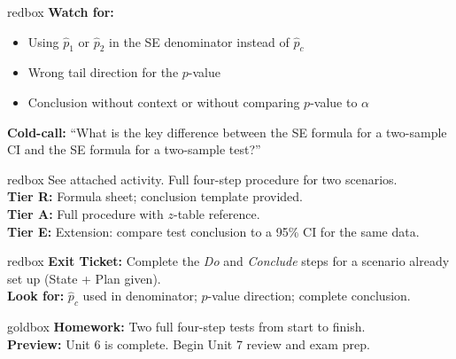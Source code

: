 \documentclass[10pt]{article}
\begin{document}
\begin{skillbox}{redbox}
    \textbf{Watch for:}
    \begin{itemize}[leftmargin=1.2em]
        \item Using $\hat p_1$ or $\hat p_2$ in the SE denominator instead of $\hat p_c$
        \item Wrong tail direction for the $p$-value
        \item Conclusion without context or without comparing $p$-value to $\alpha$
    \end{itemize}
    \textbf{Cold-call:} ``What is the key difference between the SE formula for a two-sample
    CI and the SE formula for a two-sample test?''
\end{skillbox}

\begin{skillbox}{redbox}
    See attached activity. Full four-step procedure for two scenarios.\\[4pt]
    \textbf{Tier R:} Formula sheet; conclusion template provided.\\
    \textbf{Tier A:} Full procedure with $z$-table reference.\\
    \textbf{Tier E:} Extension: compare test conclusion to a 95\% CI for the same data.
\end{skillbox}

\begin{skillbox}{redbox}
    \textbf{Exit Ticket:} Complete the \textit{Do} and \textit{Conclude} steps for a scenario
    already set up (State + Plan given).\\[4pt]
    \textbf{Look for:} $\hat p_c$ used in denominator; $p$-value direction; complete conclusion.
\end{skillbox}

\begin{skillbox}{goldbox}
    \textbf{Homework:} Two full four-step tests from start to finish.\\[4pt]
    \textbf{Preview:} Unit 6 is complete. Begin Unit 7 review and exam prep.
\end{skillbox}
\end{document}
